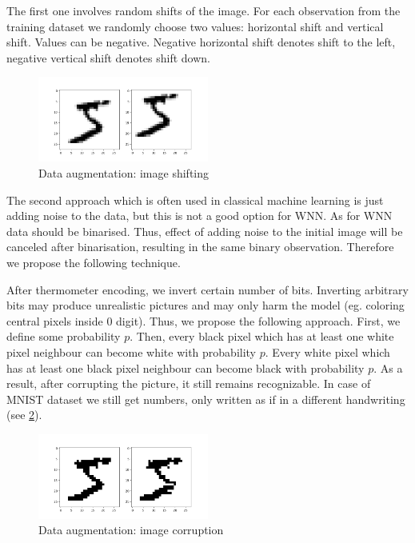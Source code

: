 \documentclass{article}[12pt]
\begin{document}
The first one involves random shifts of the image. For each observation from the training dataset we randomly choose two values: horizontal shift and vertical shift. Values can be negative. Negative horizontal shift denotes shift to the left, negative vertical shift denotes shift down.

\begin{figure}[h]
    \centering
    \includegraphics[width=0.5\textwidth]{imgs/img_shift.png}
    \caption{Data augmentation: image shifting}
    \label{fig 1}
\end{figure}

The second approach which is often used in classical machine learning is just adding noise to the data, but this is not a good option for WNN. As for WNN data should be binarised. Thus, effect of adding noise to the initial image will be canceled  after binarisation, resulting in the same binary observation. Therefore we propose the following technique.

After thermometer encoding, we invert certain number of bits. Inverting arbitrary bits may produce unrealistic pictures and may only harm the model (eg. coloring central pixels inside 0 digit). Thus, we propose the following approach. First, we define some probability $p$. Then, every black pixel which has at least one white pixel neighbour can become white with probability $p$. Every white pixel which has at least one black pixel neighbour can become black with probability $p$. As a result, after corrupting the picture, it still remains recognizable. In case of MNIST dataset we still get numbers, only written as if in a different handwriting (see \ref{fig 2}).

\begin{figure}[h]
    \centering
    \includegraphics[width=0.5\textwidth]{imgs/img_corruption.png}
    \caption{Data augmentation: image corruption}
    \label{fig 2}
\end{figure}
\end{document}
